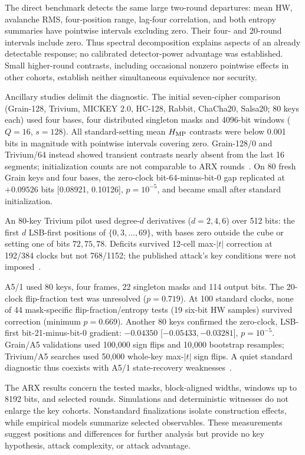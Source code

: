 \documentclass[electronics,article,submit,pdftex,oneauthor]{Definitions/mdpi}
\begin{document}
The direct benchmark detects the same large two-round departures: mean HW, avalanche RMS, four-position range, lag-four correlation, and both entropy summaries have pointwise intervals excluding zero. Their four- and 20-round intervals include zero. Thus spectral decomposition explains aspects of an already detectable response; no calibrated detector-power advantage was established. Small higher-round contrasts, including occasional nonzero pointwise effects in other cohorts, establish neither simultaneous equivalence nor security.

Ancillary studies delimit the diagnostic. The initial seven-cipher comparison (Grain-128, Trivium, MICKEY 2.0, HC-128, Rabbit, ChaCha20, Salsa20; 80 keys each) used four bases, four distributed singleton masks and 4096-bit windows ($Q=16$, $s=128$). All standard-setting mean $H_{\rm MP}$ contrasts were below 0.001 bits in magnitude with pointwise intervals covering zero. Grain-128/0 and Trivium/64 instead showed transient contrasts nearly absent from the last 16 segments; initialization counts are not comparable to ARX rounds~\citep{grain2006,trivium2006,estream2008}. On 80 fresh Grain keys and four bases, the zero-clock bit-64-minus-bit-0 gap replicated at $+0.09526$ bits [0.08921, 0.10126], $p=10^{-5}$, and became small after standard initialization.

An 80-key Trivium pilot used degree-$d$ derivatives ($d=2,4,6$) over 512 bits: the first $d$ LSB-first positions of $\{0,3,\ldots,69\}$, with bases zero outside the cube or setting one of bits $72,75,78$. Deficits survived 12-cell max-$|t|$ correction at 192/384 clocks but not 768/1152; the published attack's key conditions were not imposed~\citep{knellwolf2011}.

A5/1 used 80 keys, four frames, 22 singleton masks and 114 output bits. The 20-clock flip-fraction test was unresolved ($p=0.719$). At 100 standard clocks, none of 44 mask-specific flip-fraction/entropy tests (19 six-bit HW samples) survived correction (minimum $p=0.669$). Another 80 keys confirmed the zero-clock, LSB-first bit-21-minus-bit-0 gradient: $-0.04350$ [$-0.05433,-0.03281$], $p=10^{-5}$. Grain/A5 validations used 100,000 sign flips and 10,000 bootstrap resamples; Trivium/A5 searches used 50,000 whole-key max-$|t|$ sign flips. A quiet standard diagnostic thus coexists with A5/1 state-recovery weaknesses~\citep{biryukov2000}.

The ARX results concern the tested masks, block-aligned widths, windows up to 8192 bits, and selected rounds. Simulations and deterministic witnesses do not enlarge the key cohorts. Nonstandard finalizations isolate construction effects, while empirical models summarize selected observables. These measurements suggest positions and differences for further analysis but provide no key hypothesis, attack complexity, or attack advantage.
\end{document}
